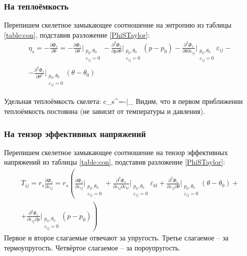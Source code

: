 \documentclass[main.tex]{subfiles}
\begin{document}
\subsubsection{На теплоёмкость}
Перепишем скелетное замыкающее соотношение на энтропию из таблицы \ref{table:con}, подставив разложение \ref{PhiSTaylor}:
\begin{multline}
\eta_s=-\frac{\partial\Phi_s}{\partial\theta}=-\frac{\partial\Phi_s}{\partial\theta}\bigg|_{\substack{p_0,\theta_0\\\varepsilon_{ij}=0}}-\frac{\partial^2\Phi_s}{\partial p\partial\theta}\bigg|_{\substack{p_0,\theta_0\\\varepsilon_{ij}=0}}\left(p-p_0\right)-\frac{\partial^2\Phi_s}{\partial\theta\partial\varepsilon_{ij}}\bigg|_{\substack{p_0,\theta_0\\\varepsilon_{ij}=0}}\varepsilon_{ij}-\\-\frac{\partial^2\Phi_s}{\partial\theta^2}\bigg|_{\substack{p_0,\theta_0\\\varepsilon_{ij}=0}}\left(\theta-\theta_0\right)
\end{multline}

Удельная теплоёмкость скелета:
\beq
c_s^\theta=\theta{}\approx -\theta{}\bigg|_{}
\eeq
Видим, что в первом приближении теплоёмкость постоянна (не зависит от температуры и давления).

\subsubsection{На тензор эффективных напряжений}
Перепишем скелетное замыкающее соотношение на тензор эффективных напряжений из таблицы \ref{table:con}, подставив разложение \ref{PhiSTaylor}:
\begin{multline}\label{TIJ}
T_{ij}=r_s\frac{\partial\Phi_s}{\partial\varepsilon_{ij}}=r_s\left(\frac{\partial\Phi_s}{\partial\varepsilon_{ij}}\bigg|_{\substack{p_0,\theta_0\\\varepsilon_{ij}=0}}+\frac{\partial^2\Phi_s}{\partial\varepsilon_{ij}\partial\varepsilon_{kl}}\bigg|_{\substack{p_0,\theta_0\\\varepsilon_{ij}=0}}\varepsilon_{kl}+\frac{\partial^2\Phi_s}{\partial\varepsilon_{ij}\partial\theta}\bigg|_{\substack{p_0,\theta_0\\\varepsilon_{ij}=0}}\left(\theta-\theta_0\right)+\right. \\ \left.+\frac{\partial^2\Phi_s}{\partial\varepsilon_{ij}\partial p}\bigg|_{\substack{p_0,\theta_0\\\varepsilon_{ij}=0}}\left(p-p_0\right)\right)
\end{multline}
Первое и второе слагаемые отвечают за упругость. Третье слагаемое -- за термоупругость. Четвёртое слагаемое -- за пороупругость.
\end{document}
